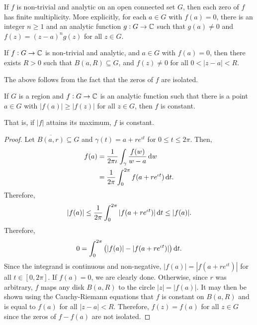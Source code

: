 	\begin{corollary}
		\label{cor: finite multiplicity}
		If $f$ is non-trivial and analytic on an open connected set $G$, then each zero of $f$ has finite multiplicity. More explicitly, for each $a \in G$ with $f(a) = 0$, there is an integer $n \ge 1$ and an analytic function $g : G \to \mathbb{C}$ such that $g(a) \ne 0$ and $f(z) = (z-a)^n g(z)$ for all $z \in G$.
	\end{corollary}

	\begin{corollary}
		If $f : G \to \mathbb{C}$ is non-trivial and analytic, and $a \in G$ with $f(a) = 0$, then there exists $R > 0$ such that $B(a,R) \subseteq G$, and $f(z) \ne 0$ for all $0 < |z-a| < R$. 
	\end{corollary}
	The above follows from the fact that the zeros of $f$ are isolated.

	\begin{ftheo}
		\label{theo: maximum modulus theorem}
		If $G$ is a region and $f:G\to\mathbb{C}$ is an analytic function such that there is a point $a\in G$ with $|f(a)| \ge |f(z)|$ for all $z \in G$, then $f$ is constant.
	\end{ftheo}
	That is, if $|f|$ attains its maximum, $f$ is constant.
	\begin{proof}
		Let $\overline{B(a,r)} \subseteq G$ and $\gamma(t) = a + re^{\iota t}$ for $0 \le t \le 2\pi$. Then,
		\begin{align*}
			f(a) &= \frac{1}{2\pi\iota} \int_\gamma \frac{f(w)}{w-a} \dif w \\
				&= \frac{1}{2\pi} \int_0^{2\pi} f(a + re^{\iota t}) \dif t.
		\end{align*}
		Therefore,
		\[ |f(a)| \le \frac{1}{2\pi} \int_0^{2\pi} |f(a+re^{\iota t})| \dif t \le |f(a)|. \]
		Therefore,
		\[ 0 = \int_0^{2\pi} \left( |f(a)| - |f(a+re^{\iota t})| \right) \dif t. \]
		Since the integrand is continuous and non-negative, $|f(a)| = |f(a+re^{\iota t})|$ for all $t \in [0,2\pi]$. If $f(a) = 0$, we are clearly done. Otherwise, since $r$ was arbitrary, $f$ maps any disk $B(a,R)$ to the circle $|z| = |f(a)|$. It may then be shown using the Cauchy-Riemann equations that $f$ is constant on $B(a,R)$ and is equal to $f(a)$ for all $|z-a| < R$. Therefore, $f(z) = f(a)$ for all $z \in G$ since the zeros of $f-f(a)$ are not isolated.
	\end{proof}